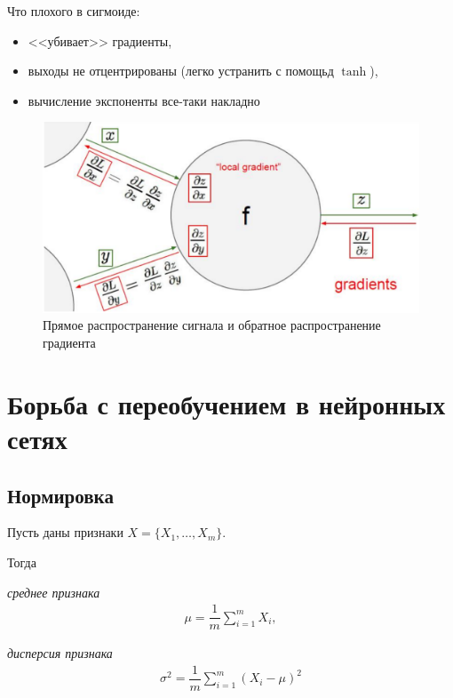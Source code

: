\documentclass[%
	11pt,
	a4paper,
	utf8,
		]{article}
\begin{document}
Что плохого в сигмоиде:
\begin{itemize}
	\item <<убивает>> градиенты,
	
	\item выходы не отцентрированы (легко устранить с помощьд $ \tanh $),
	
	\item вычисление экспоненты все-таки накладно
\end{itemize}


\begin{figure}[h]
	\centering
	\includegraphics[scale=0.5]{figures/backprop.png}
	\caption{ Прямое распространение сигнала и обратное распространение градиента }\label{fig:backprop}
\end{figure}

\section{Борьба с переобучением в нейронных сетях}

\subsection{Нормировка}

Пусть даны признаки $ X = \{X_1, \ldots, X_m\} $.

Тогда

\emph{среднее признака}
\begin{align*}
	\mu = \dfrac{1}{m} \sum_{i=1}^m X_i,
\end{align*}

\emph{дисперсия признака}
\begin{align*}
	\sigma^2 = \dfrac{1}{m} \sum_{i=1}^m (X_i - \mu)^2
\end{align*}
\end{document}
